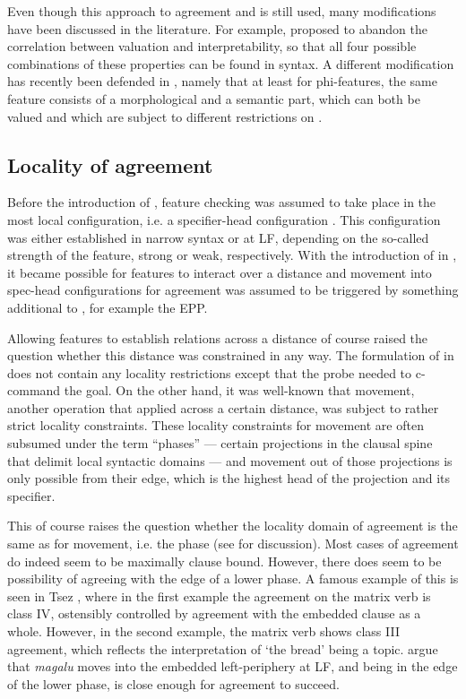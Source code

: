 \documentclass[output=paper
,modfonts
,nonflat]{langsci/langscibook}
\begin{document}
Even though this approach  to agreement and \agr{} is still used, many modifications have been discussed in the literature. For example, \citet{pesetskytorrego2007} proposed to abandon the correlation between valuation and interpretability, so that all four possible combinations of these properties can be found in syntax.
A different modification has recently been defended in \citet{smithdiss,smithsse}, namely that at least for phi-fea\-tures, the same feature consists of a morphological and a semantic part, which can both be valued and which are subject to different restrictions on \agr.


\subsection{Locality of agreement}
\label{sec:locality}

Before the introduction of \agr, feature checking was assumed to take place in the most local configuration, i.e. a specifier-head configuration \citep{Chomsky1995}. This configuration was either established in narrow syntax or at LF, depending on the so-called strength of the feature, strong or weak, respectively. With the introduction of \agr{} in \citet{Chomsky2000,Chomsky2001}, it became possible for features to interact over a distance and movement into spec-head configurations for agreement was assumed to be triggered by something additional to \agr, for example the EPP.

Allowing features to establish relations across a distance of course raised the question whether this distance was constrained in any way. The formulation of \agr{} in \citet{Chomsky2000,Chomsky2001} does not contain any locality restrictions except that the probe needed to c-command the goal. On the other hand, it was well-known that movement, another operation that applied across a certain distance, was subject to rather strict locality constraints.
These locality constraints for movement are often subsumed under the term ``phases'' --- certain projections in the clausal spine that delimit local syntactic domains --- and movement out of those projections is only possible from their edge, which is the highest head of the projection and its specifier.

This of course raises the question whether the locality domain of agreement is the same as for movement, i.e. the phase (see \citealp{bobaljikwurmbrand2005} for discussion).
Most cases of agreement do indeed seem to be maximally clause bound.
However, there does seem to be possibility of agreeing with the edge of a lower phase.
A famous example of this is seen in Tsez \citep{polinskypotsdam2001}, where in the first example the agreement on the matrix verb is class \textsc{IV}, ostensibly controlled by agreement with the embedded clause as a whole.
However, in the second example, the matrix verb shows class \textsc{III} agreement, which reflects the interpretation of `the bread' being a topic.
\citet{polinskypotsdam2001} argue that \textit{magalu} moves into the embedded left-periphery at LF, and being in the edge of the lower phase, is close enough for agreement to succeed.
\end{document}
